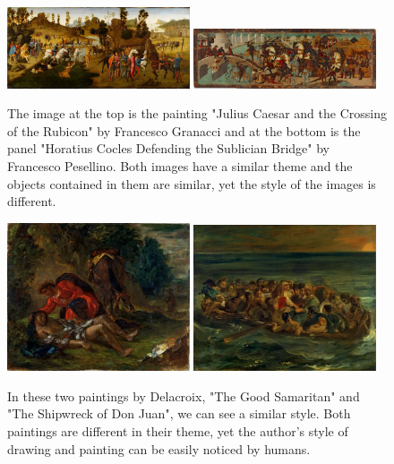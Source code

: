 \documentclass[a4paper,twocolumn]{article}
\begin{document}
\begin{figure}[!htb]
\centering
\includegraphics[width=0.48\textwidth]{diff_caesar}
\includegraphics[width=0.48\textwidth]{diff_horatius}
\caption{The image at the top is the painting "Julius Caesar and the Crossing
of the Rubicon" by Francesco Granacci and at the bottom is the panel "Horatius
Cocles Defending the Sublician Bridge" by Francesco Pesellino.  Both images
have a similar theme and the objects contained in them are similar, yet the
style of the images is different.}
\label{diff}
\end{figure}

\begin{figure}[!htb]
\centering
\includegraphics[width=0.48\textwidth]{sim_delacroix_samaritan}
\includegraphics[width=0.48\textwidth]{sim_delacroix_shipwreck}
\caption{In these two paintings by Delacroix, "The Good Samaritan" and "The
Shipwreck of Don Juan", we can see a similar style.  Both paintings are
different in their theme, yet the author's style of drawing and painting can be
easily noticed by humans.}
\label{similar}
\end{figure}
\end{document}
